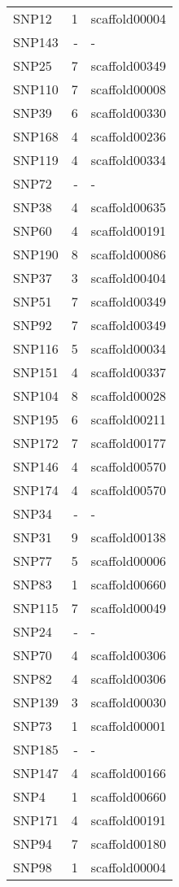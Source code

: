 \documentclass[smallextended]{svjour3}       %
\begin{document}
\begin{longtable}{lrl}
  SNP12 &   1 & scaffold00004 \\ 
  SNP143 & - & - \\ 
  SNP25 &   7 & scaffold00349 \\ 
  SNP110 &   7 & scaffold00008 \\ 
  SNP39 &   6 & scaffold00330 \\ 
  SNP168 &   4 & scaffold00236 \\ 
  SNP119 &   4 & scaffold00334 \\ 
  SNP72 & - & - \\ 
  SNP38 &   4 & scaffold00635 \\ 
  SNP60 &   4 & scaffold00191 \\ 
  SNP190 &   8 & scaffold00086 \\ 
  SNP37 &   3 & scaffold00404 \\ 
  SNP51 &   7 & scaffold00349 \\ 
  SNP92 &   7 & scaffold00349 \\ 
  SNP116 &   5 & scaffold00034 \\ 
  SNP151 &   4 & scaffold00337 \\ 
  SNP104 &   8 & scaffold00028 \\ 
  SNP195 &   6 & scaffold00211 \\ 
  SNP172 &   7 & scaffold00177 \\ 
  SNP146 &   4 & scaffold00570 \\ 
  SNP174 &   4 & scaffold00570 \\ 
  SNP34 & - & - \\ 
  SNP31 &   9 & scaffold00138 \\ 
  SNP77 &   5 & scaffold00006 \\ 
  SNP83 &   1 & scaffold00660 \\ 
  SNP115 &   7 & scaffold00049 \\ 
  SNP24 & - & - \\ 
  SNP70 &   4 & scaffold00306 \\ 
  SNP82 &   4 & scaffold00306 \\ 
  SNP139 &   3 & scaffold00030 \\ 
  SNP73 &   1 & scaffold00001 \\ 
  SNP185 & - & - \\ 
  SNP147 &   4 & scaffold00166 \\ 
  SNP4 &   1 & scaffold00660 \\ 
  SNP171 &   4 & scaffold00191 \\ 
  SNP94 &   7 & scaffold00180 \\ 
  SNP98 &   1 & scaffold00004 \\ 
\hline
\end{longtable}
\end{document}
